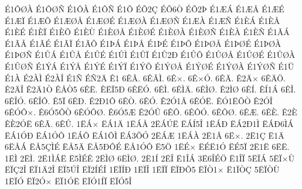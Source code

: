 {^^c91^^d4^^d8^^c0
^^c91^^d4^^d8^^d1
^^c91^^d4^^c0
^^c91^^d4^^d1
^^c91^^d5
^^c9^^d52^^c7
^^c9^^d56^^d2
^^c9^^d52^^de
^^c91^^c6^^c1
^^c91^^c6^^c5
^^c91^^c6^^c9
^^c91^^c6^^cf
^^c91^^c6^^d5
^^c91^^c6^^d8^^c5
^^c91^^c6^^d8^^c9
^^c91^^c6^^d8^^c0
^^c91^^c6^^d8^^d1
^^c91^^c6^^c0
^^c91^^c6^^d1
^^c91^^c8^^c1
^^c91^^c8^^c5
^^c91^^c8^^c9
^^c91^^c8^^cf
^^c91^^c8^^d5
^^c91^^c8^^d9
^^c91^^c8^^d8^^c5
^^c91^^c8^^d8^^c9
^^c91^^c8^^d8^^c0
^^c91^^c8^^d8^^d1
^^c91^^c8^^c0
^^c91^^c8^^d1
^^c91^^c3^^c1
^^c91^^c3^^c5
^^c91^^c3^^c9
^^c91^^c3^^cf
^^c91^^c3^^d5
^^c91^^de^^c1
^^c91^^de^^c5
^^c91^^de^^c9
^^c91^^de^^d5
^^c91^^de^^d8^^c5
^^c91^^de^^d8^^c9
^^c91^^de^^d8^^c0
^^c91^^de^^d8^^d1
^^c91^^db^^c1
^^c91^^db^^c5
^^c91^^db^^c9
^^c91^^db^^cc
^^c91^^db^^cf
^^c91^^db2^^d0
^^c91^^db^^d5
^^c91^^db^^d8^^c5
^^c91^^db^^d8^^c9
^^c91^^db^^d8^^c0
^^c91^^db^^d8^^d1
^^c91^^dd^^c1
^^c91^^dd^^c5
^^c91^^dd^^c9
^^c91^^dd^^cf
^^c91^^dd^^d5
^^c91^^dd^^d8^^c5
^^c91^^dd^^d8^^c9
^^c91^^dd^^d8^^c0
^^c91^^dd^^d8^^d1
^^c91^^dc
^^c91^^c0
^^c92^^c0^^cc
^^c92^^c0^^ce
^^c91^^d1
^^c9^^d12^^c4
^^ca1
6^^ca^^c2.
6^^ca^^c2^^cc.
6^^ca^^d7.
6^^ca^^d7^^d3.
6^^ca^^c4.
^^ca2^^c4^^d7
6^^ca^^c4^^d6.
^^ca2^^c4^^ce
^^ca2^^c41^^d2
^^ca^^c5^^d25
6^^ca^^cb.
^^ca^^cb^^cf5^^d0
6^^ca^^cb^^d3.
6^^ca^^cc.
6^^ca^^cc^^c4.
6^^ca^^cc^^d8.
^^ca2^^cc^^d8
6^^ca^^cd.
^^ca^^cd1^^c1
6^^ca^^ce.
6^^ca^^ce^^d3.
6^^ca^^ce^^d4.
^^ca5^^cf
6^^ca^^d0.
^^ca2^^d01^^d4
6^^ca^^d2.
6^^ca^^d3.
^^ca2^^d31^^c2
6^^ca^^d3^^cb.
^^ca^^d31^^cb^^d5^^d2
^^ca2^^d3^^ce
6^^ca^^d3^^d4^^d7.
^^ca6^^d35^^d4^^d2
6^^ca^^d3^^d4^^d8.
^^ca6^^d35^^c6
^^ca2^^d3^^db
6^^ca^^d4.
6^^ca^^d4^^d3.
6^^ca^^d4^^d8.
6^^ca^^c6.
6^^ca^^c8.
^^ca2^^c8
^^ca^^c82^^d3^^cb
6^^ca^^c3.
6^^ca^^db.
1^^cb^^c1^^d7
^^cb^^c11^^c4
1^^cb^^c1^^c5
2^^cb^^c1^^da^^cb
^^cb^^c1^^cd5^^ce
1^^cb^^c1^^d0
^^cb^^c12^^d01^^cc
^^cb^^c1^^d06^^cc^^c1
^^cb^^c11^^d3^^d0
^^cb^^c11^^d3^^d4
1^^cb^^c1^^d4
^^cb^^c11^^d4^^cc
^^cb^^c13^^d5^^d3
2^^cb^^c1^^c6
1^^cb^^c1^^c0
2^^cb1^^c2
6^^cb^^d7.
2^^cb1^^c7
^^cb1^^c4
6^^cb^^c5^^c1
^^cb^^c55^^c7^^cc^^c9
^^cb^^c55^^c4
^^cb^^c55^^d0^^d4^^c9
^^cb^^c51^^d3^^d4
^^cb5^^d6
1^^cb^^c9^^d7
^^cb^^c9^^cb1^^d3
^^cb^^c95^^cf
2^^cb1^^cb
6^^cb^^cb.
1^^cb^^cc
2^^cb^^cc.
2^^cb1^^cc^^c1^^cb
^^cb5^^cc^^c9^^ca
2^^cb^^cc^^d8
6^^cb^^cc^^d8.
2^^cb1^^cd
2^^cb^^ce
^^cb1^^ce^^c1
3^^cb6^^ce^^c9^^d6
^^cb1^^ce^^cf
5^^cb^^cf^^c1
5^^cb^^cf^^d7^^d9
^^cb^^cf^^c72^^ce
^^cb^^cf1^^c42^^ce
^^cb^^cf5^^da^^ce
^^cb^^cf2^^cd^^c9^^ce
1^^cb^^cf^^cd^^d0
1^^cb^^cf^^ce
1^^cb^^cf^^cf
^^cb^^cf^^d0^^d55
^^cb^^cf^^d21^^d7
^^cb1^^cf^^d2^^c7
5^^cb^^cf^^d2^^d9
1^^cb^^cf^^d3
^^cb^^cf2^^d3^^d7
^^cb^^cf1^^d3^^cb
^^cb^^cf^^d31^^cd^^cf
^^cb^^cf^^d35^^ce
}
